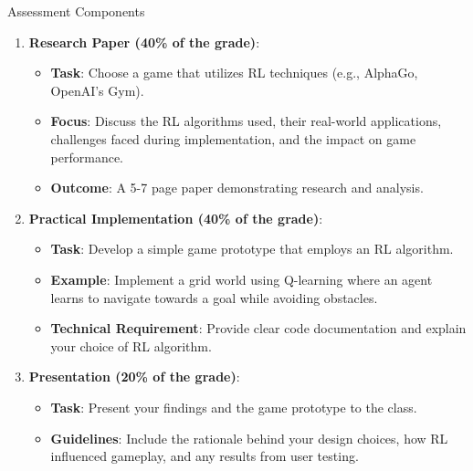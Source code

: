 \documentclass[aspectratio=169]{beamer}
\begin{document}
\begin{frame}[fragile]{Assessment Components}
    \begin{enumerate}
        \item \textbf{Research Paper (40\% of the grade)}:
            \begin{itemize}
                \item \textbf{Task}: Choose a game that utilizes RL techniques (e.g., AlphaGo, OpenAI's Gym).
                \item \textbf{Focus}: Discuss the RL algorithms used, their real-world applications, challenges faced during implementation, and the impact on game performance.
                \item \textbf{Outcome}: A 5-7 page paper demonstrating research and analysis.
            \end{itemize}
        
        \item \textbf{Practical Implementation (40\% of the grade)}:
            \begin{itemize}
                \item \textbf{Task}: Develop a simple game prototype that employs an RL algorithm.
                \item \textbf{Example}: Implement a grid world using Q-learning where an agent learns to navigate towards a goal while avoiding obstacles.
                \item \textbf{Technical Requirement}: Provide clear code documentation and explain your choice of RL algorithm.
            \end{itemize}
        
        \item \textbf{Presentation (20\% of the grade)}:
            \begin{itemize}
                \item \textbf{Task}: Present your findings and the game prototype to the class.
                \item \textbf{Guidelines}: Include the rationale behind your design choices, how RL influenced gameplay, and any results from user testing.
            \end{itemize}
    \end{enumerate}
\end{frame}
\end{document}
